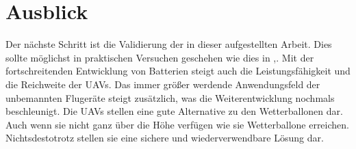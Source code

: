 \section{Ausblick}
Der nächste Schritt ist die Validierung der in dieser aufgestellten Arbeit. Dies sollte möglichst in praktischen Versuchen geschehen wie dies in \cite{Ostler.2007},\cite{PCUP}. Mit der fortschreitenden Entwicklung von Batterien steigt auch die Leistungsfähigkeit und die Reichweite der UAVs. Das immer größer werdende Anwendungsfeld der unbemannten Flugeräte steigt zusätzlich, was die Weiterentwicklung nochmals beschleunigt.
Die UAVs stellen eine gute Alternative zu den Wetterballonen dar. Auch wenn sie nicht ganz über die Höhe verfügen wie sie Wetterballone erreichen. Nichtsdestotrotz stellen sie eine sichere und wiederverwendbare Lösung dar.


